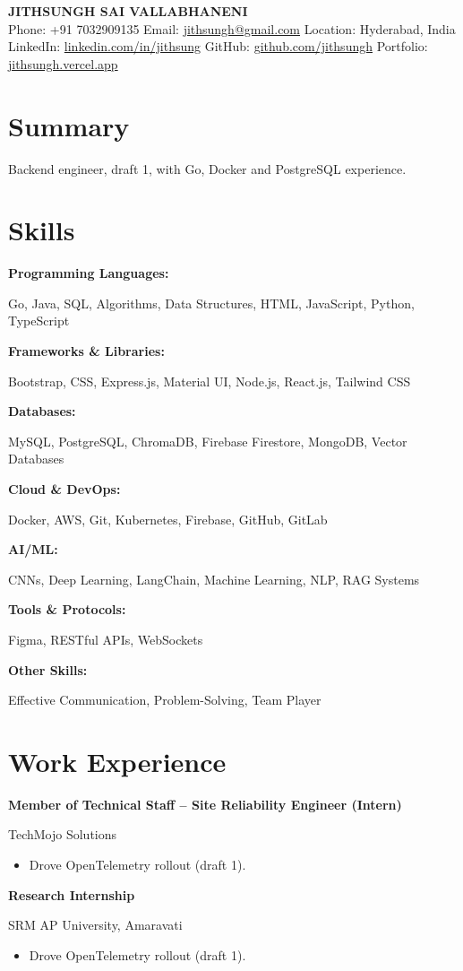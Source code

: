 \documentclass[a4paper,10pt]{article}
\newcommand{\tworow}[2]{%
  \noindent%
  \begin{minipage}[t]{0.615\textwidth}\raggedright #1\end{minipage}%
  \hfill%
  \begin{minipage}[t]{0.365\textwidth}\raggedleft #2\end{minipage}%
  \par%
}
\newcommand{\resumeheader}[3]{%
  \begin{center}
    {\LARGE \textbf{#1}} \\[0.5em]
    \small #2 \\[0.3em]
    \small #3
  \end{center}
}
\newcommand{\expentry}[3]{%
  \tworow{\textbf{#1}}{#2}%
  \ifx\relax#3\relax\else\textit{\small #3}\par\fi
}
\newenvironment{rbullets}{%
  \vspace{0.12em}%
  \begin{itemize}[leftmargin=1.1em, labelsep=0.4em, label=\textbullet,
                  itemsep=0.12em, topsep=0.08em, parsep=0pt, partopsep=0pt]%
}{%
  \end{itemize}%
}
\newcommand{\entrygap}{\vspace{0.55em}}
\newcommand{\skillrow}[2]{%
  \noindent%
  \begin{minipage}[t]{0.27\textwidth}\raggedright\textbf{#1}\end{minipage}%
  \begin{minipage}[t]{0.73\textwidth}\raggedright #2\end{minipage}%
  \par\vspace{0.18em}%
}
\begin{document}
\resumeheader{JITHSUNGH SAI VALLABHANENI}{%
  Phone: +91 7032909135 \quad  Email: \href{mailto:jithsungh@gmail.com}{jithsungh@gmail.com} \quad  Location: Hyderabad, India }{%
  LinkedIn: \href{https://linkedin.com/in/jithsung}{linkedin.com/in/jithsung} \quad  GitHub: \href{https://github.com/jithsungh}{github.com/jithsungh} \quad  Portfolio: \href{https://jithsungh.vercel.app}{jithsungh.vercel.app} }

\section*{Summary}
Backend engineer, draft 1, with Go, Docker and PostgreSQL experience.

\section*{Skills}
\skillrow{Programming Languages:}{Go, Java, SQL, Algorithms, Data Structures, HTML, JavaScript, Python, TypeScript}
\skillrow{Frameworks \& Libraries:}{Bootstrap, CSS, Express.js, Material UI, Node.js, React.js, Tailwind CSS}
\skillrow{Databases:}{MySQL, PostgreSQL, ChromaDB, Firebase Firestore, MongoDB, Vector Databases}
\skillrow{Cloud \& DevOps:}{Docker, AWS, Git, Kubernetes, Firebase, GitHub, GitLab}
\skillrow{AI/ML:}{CNNs, Deep Learning, LangChain, Machine Learning, NLP, RAG Systems}
\skillrow{Tools \& Protocols:}{Figma, RESTful APIs, WebSockets}
\skillrow{Other Skills:}{Effective Communication, Problem-Solving, Team Player}

\section*{Work Experience}
\expentry{Member of Technical Staff -- Site Reliability Engineer (Intern)}{TechMojo Solutions}{}
\begin{rbullets}
  \item Drove OpenTelemetry rollout (draft 1).
\end{rbullets}
\entrygap
\expentry{Research Internship}{SRM AP University, Amaravati}{}
\begin{rbullets}
  \item Drove OpenTelemetry rollout (draft 1).
\end{rbullets}
\end{document}
